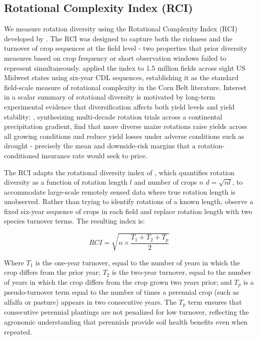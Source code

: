 \documentclass[12pt,letterpaper]{article}
\theoremstyle{remark}
\theoremstyle{remark}
\theoremstyle{plain}
\theoremstyle{definition}
\begin{document}
\subsection{\label{subsec:rci}Rotational Complexity Index (RCI)}	
We measure rotation diversity using the Rotational Complexity Index (RCI) developed by \citet{socolar2021}. The RCI was designed to capture both the richness and the turnover of crop sequences at the field level - two properties that prior diversity measures based on crop frequency or short observation windows failed to represent simultaneously. \citet{socolar2021} applied the index to 1.5 million fields across eight US Midwest states using six-year CDL sequences, establishing it as the standard field-scale measure of rotational complexity in the Corn Belt literature. Interest in a scalar summary of rotational diversity is motivated by long-term experimental evidence that diversification affects both yield levels and yield stability: \citet{bowles2020}, synthesizing multi-decade rotation trials across a continental precipitation gradient, find that more diverse maize rotations raise yields across all growing conditions and reduce yield losses under adverse conditions such as drought - precisely the mean and downside-risk margins that a rotation-conditioned insurance rate would seek to price.

The RCI adapts the rotational diversity index of \citet{Tiemann2016}, which quantifies rotation diversity as a function of rotation length $l$ and number of crops $n$ $d = \sqrt{nl}$, to accommodate large-scale remotely sensed data where true rotation length is unobserved. Rather than trying to identify rotations of a known length, \citet{socolar2021} observe a fixed six-year sequence of crops in each field and replace rotation length with two species turnover terms. The resulting index is:

\begin{equation}
    RCI = \sqrt{n\times \dfrac{T_{1}+T_{2}+T_{p}}{2}}\label{eq:rci}
\end{equation}

Where $T_{1}$ is the one-year turnover, equal to the number of years in which the crop differs from the prior year; $T_{2}$ is the two-year turnover, equal to the number of years in which the crop differs from the crop grown two years prior; and $T_{p}$ is a pseudo-turnover term equal to the number of times a perennial crop (such as alfalfa or pasture) appears in two consecutive years. The $T_{p}$ term ensures that consecutive perennial plantings are not penalized for low turnover, reflecting the agronomic understanding that perennials provide soil health benefits even when repeated. 
\end{document}
